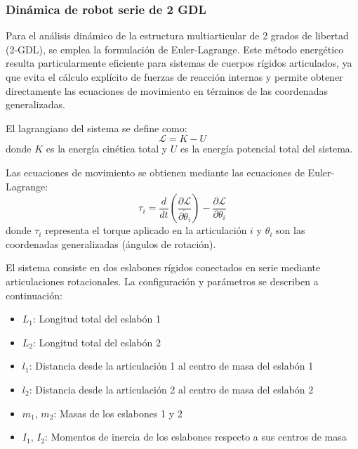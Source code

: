 \subsubsection{Dinámica de robot serie de 2 GDL}
Para el análisis dinámico de la estructura multiarticular de 2 grados de libertad (2-GDL), se emplea la formulación de Euler-Lagrange. Este método energético resulta particularmente eficiente para sistemas de cuerpos rígidos articulados, ya que evita el cálculo explícito de fuerzas de reacción internas y permite obtener directamente las ecuaciones de movimiento en términos de las coordenadas generalizadas.

El lagrangiano del sistema se define como:
\begin{equation}
\mathcal{L} = K - U
\end{equation}
donde $K$ es la energía cinética total y $U$ es la energía potencial total del sistema.

Las ecuaciones de movimiento se obtienen mediante las ecuaciones de Euler-Lagrange:
\begin{equation}
\tau_i = \frac{d}{dt}\left(\frac{\partial \mathcal{L}}{\partial \dot{\theta}_i}\right) - \frac{\partial \mathcal{L}}{\partial \theta_i}
\end{equation}
donde $\tau_i$ representa el torque aplicado en la articulación $i$ y $\theta_i$ son las coordenadas generalizadas (ángulos de rotación).


El sistema consiste en dos eslabones rígidos conectados en serie mediante articulaciones rotacionales. La configuración y parámetros se describen a continuación:
\begin{itemize}
    \item $L_1$: Longitud total del eslabón 1
    \item $L_2$: Longitud total del eslabón 2
    \item $l_1$: Distancia desde la articulación 1 al centro de masa del eslabón 1
    \item $l_2$: Distancia desde la articulación 2 al centro de masa del eslabón 2
    \item $m_1$, $m_2$: Masas de los eslabones 1 y 2
    \item $I_1$, $I_2$: Momentos de inercia de los eslabones respecto a sus centros de masa
\end{itemize}

